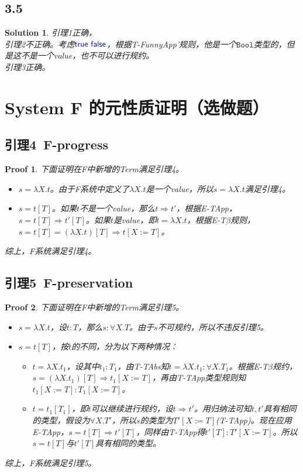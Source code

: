 \documentclass[11pt, a4paper]{article}
\newtheorem{Proof}{Proof}
\newtheorem{Solution}{Solution}
\let\t\texttt
\newcommand{\Bool}{\t{Bool}}
\newcommand{\kword}[1]{{\color{blue} \textsf{#1}}}
\newcommand{\True}{\kword{true}}
\newcommand{\False}{\kword{false}}
\begin{document}
    \subsection*{3.5}
    \begin{Solution}
        引理1正确，\\
        引理2不正确。考虑$\True~\False$，根据T-FunnyApp'规则，他是一个$\Bool$类型的，但是这不是一个value，也不可以进行规约。\\
        引理3正确。
    \end{Solution}

\section{System F 的元性质证明（选做题）}
    \subsection*{引理4~F-progress}
    \begin{Proof}
        下面证明在F中新增的Term满足引理4。
        \begin{itemize}
            \item $s=\lambda X.t$。由于F系统中定义了$\lambda X.t$是一个value，所以$s=\lambda X.t$满足引理4。
            \item $s=t[T]$。如果$t$不是一个value，那么$t\Rightarrow t'$，根据E-TApp，$s=t[T]\Rightarrow t'[T]$。如果$t$是value，即$t=\lambda X.t$，根据E-T$\beta$规则，$s=t[T]=(\lambda X.t)[T]\Rightarrow t[X:=T]$。
        \end{itemize}
        综上，F系统满足引理4。
    \end{Proof}
    \subsection*{引理5~F-preservation}
    \begin{Proof}
        下面证明在F中新增的Term满足引理5。
        \begin{itemize}
            \item $s=\lambda X.t$，设$t:T$，那么$s:\forall X.T$。由于$s$不可规约，所以不违反引理5。
            \item $s=t[T]$，按$t$的不同，分为以下两种情况：
            \begin{itemize}
                \item $t=\lambda X.t_1$，设其中$t_1:T_1$，由T-TAbs知$t=\lambda X.t_1:\forall X.T_1$。根据E-T$\beta$规约，$s=(\lambda X.t_1)[T]\Rightarrow t_1[X:=T]$，再由T-TApp类型规则知$t_1[X:=T]:T_1[X:=T]$。
                \item $t=t_1[T_1]$，即$t$可以继续进行规约，设$t\Rightarrow t'$。用归纳法可知$t,t'$具有相同的类型，假设为$\forall X.T'$，所以$s$的类型为$T'[X:=T]$(T-TApp)。现在应用E-TApp，$s=t[T]\Rightarrow t'[T]$，同样由T-TApp得$t'[T]:T'[X:=T]$。所以$s=t[T]$与$t'[T]$具有相同的类型。
            \end{itemize}
        \end{itemize}
        综上，F系统满足引理5。
    \end{Proof}
\end{document}

